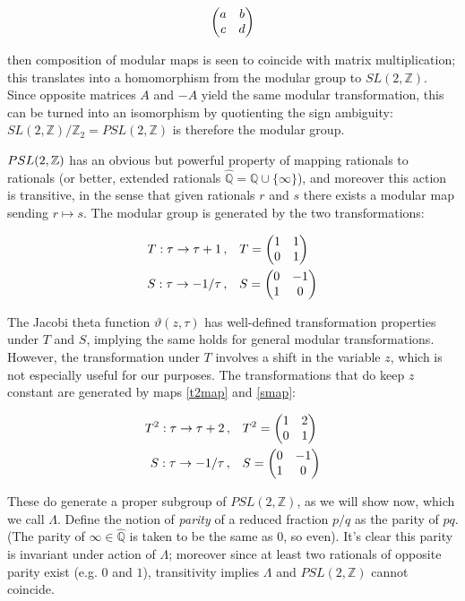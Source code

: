 \documentclass{article}
\begin{document}
\begin{equation}
    \mqty( a & b \\ c & d)
\end{equation}

then composition of modular maps is seen to coincide with matrix multiplication; this translates into a homomorphism from the modular group to $SL(2,\mathbb{Z})$. Since opposite matrices $A$ and $-A$ yield the same modular transformation, this can be turned into an isomorphism by quotienting the sign ambiguity: $SL(2,\mathbb{Z})/\mathbb{Z}_2 = PSL(2,\mathbb{Z})$ is therefore the modular group.

$PSL(2,\mathbb{Z})$ has an obvious but powerful property of mapping rationals to rationals (or better, extended rationals $\hat{\mathbb{Q}} = \mathbb{Q} \cup \{\infty\}$), and moreover this action is transitive, in the sense that given rationals $r$ and $s$ there exists a modular map sending $r\mapsto s$. The modular group is generated by the two transformations:

\begin{align}
   && T : \tau \rightarrow \tau + 1\,, \quad& T=\mqty(1 & 1 \\ 0 & 1) && \\
   && S : \tau \rightarrow -1/\tau\,, \quad& S=\mqty(0 & -1 \\ 1 & 0) &&
\end{align}

The Jacobi theta function $\vartheta(z,\tau)$ has well-defined transformation properties under $T$ and $S$, implying the same holds for general modular transformations. However, the transformation under $T$ involves a shift in the variable $z$, which is not especially useful for our purposes. The transformations that do keep $z$ constant are generated by maps \eqref{t2map} and \eqref{smap}:

\begin{align}
   && T^2 : \tau \rightarrow \tau + 2\,, \quad& T^2=\mqty(1 & 2 \\ 0 & 1) && \\
   && S : \tau \rightarrow -1/\tau\,, \quad& S=\mqty(0 & -1 \\ 1 & 0) &&
\end{align}

\newcommand{\emodg}{\Lambda}

These do generate a proper subgroup of $PSL(2,\mathbb{Z})$, as we will show now, which we call $\emodg$. Define the notion of \emph{parity} of a reduced fraction $p/q$ as the parity of $pq$. (The parity of $\infty \in \hat{\mathbb{Q}}$ is taken to be the same as $0$, so even). It's clear this parity is invariant under action of $\emodg$; moreover since at least two rationals of opposite parity exist (e.g. $0$ and $1$), transitivity implies $\emodg$ and $PSL(2,\mathbb{Z})$ cannot coincide.
\end{document}
